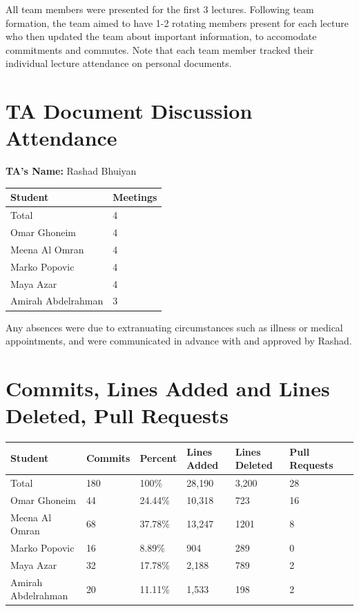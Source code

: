 \documentclass{article}
\begin{document}
All team members were presented for the first 3 lectures.
Following team formation, the team aimed to have 1-2 rotating members present for each lecture who then updated the team about important information, to accomodate
commitments and commutes.
Note that each team member tracked their individual lecture attendance on personal documents.

\section{TA Document Discussion Attendance}


\noindent \textbf{TA's Name: } Rashad Bhuiyan

\begin{table}[H]
\centering
\begin{tabular}{ll}
\toprule
\textbf{Student} & \textbf{Meetings}\\
\midrule
Total & 4\\
Omar Ghoneim & 4\\
Meena Al Omran & 4\\
Marko Popovic & 4\\
Maya Azar & 4\\
Amirah Abdelrahman & 3\\
\bottomrule
\end{tabular}
\end{table}

Any absences were due to extranuating circumstances such as illness or medical appointments, and were communicated in advance with and approved by Rashad.

\section{Commits, Lines Added and Lines Deleted, Pull Requests}

\begin{table}[H]
\centering
\begin{tabular}{lllllll}
\toprule
\textbf{Student} & \textbf{Commits} & \textbf{Percent} & \textbf{Lines Added} &
\textbf{Lines Deleted} & \textbf{Pull Requests}\\
\midrule
Total & 180 & 100\% & 28,190 & 3,200 & 28\\
Omar Ghoneim & 44 & 24.44\% & 10,318 & 723 & 16\\
Meena Al Omran & 68 & 37.78\% & 13,247 & 1201 & 8\\
Marko Popovic & 16 & 8.89\% & 904 & 289 & 0\\
Maya Azar & 32 & 17.78\% & 2,188 & 789 & 2\\
Amirah Abdelrahman & 20 & 11.11\% & 1,533 & 198 & 2\\
\bottomrule
\end{tabular}
\end{table}
\end{document}
